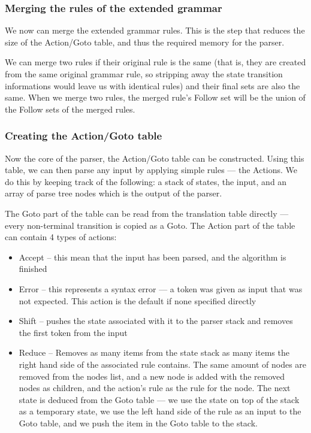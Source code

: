 \subsubsection{Merging the rules of the extended grammar} 
We now can merge the extended grammar rules. This is the step that reduces the size of the Action/Goto table, and thus the required memory for the parser.

We can merge two rules if their original rule is the same (that is, they are created from the same original grammar rule, so stripping away the state transition informations would leave us with identical rules) and their final sets are also the same. When we merge two rules, the merged rule's Follow set will be the union of the Follow sets of the merged rules. 
\subsubsection{Creating the Action/Goto table} 
Now the core of the parser, the Action/Goto table can be constructed. Using this table, we can then parse any input by applying simple rules --- the Actions. We do this by keeping track of the following: a stack of states, the input, and an array of parse tree nodes which is the output of the parser.

The Goto part of the table can be read from the translation table directly --- every non-terminal transition is copied as a Goto. The Action part of the table can contain 4 types of actions:
\begin{itemize}
\item Accept -- this mean that the input has been parsed, and the algorithm is finished
\item Error -- this represents a syntax error --- a token was given as input that was not expected. This action is the default if none specified directly
\item Shift -- pushes the state associated with it to the parser stack and removes the first token from the input
\item Reduce -- Removes as many items from the state stack as many items the right hand side of the associated rule contains. The same amount of nodes are removed from the nodes list, and a new node is added with the removed nodes as children, and the action's rule as the rule for the node. The next state is deduced from the Goto table --- we use the state on top of the stack as a temporary state, we use the left hand side of the rule as an input to the Goto table, and we push the item in the Goto table to the stack.
\end{itemize}

